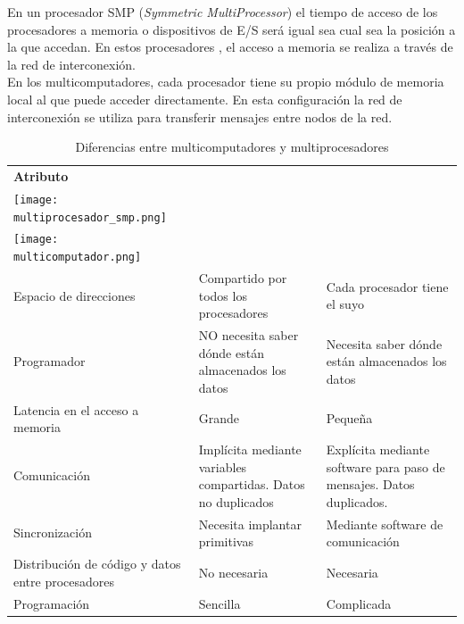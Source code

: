 \documentclass[12pt,spanish]{article}
\begin{document}
En un procesador SMP (\textit{Symmetric MultiProcessor}) el tiempo de acceso de los procesadores a memoria o dispositivos de E/S será igual sea cual sea la posición a la que accedan. En estos procesadores , el acceso a memoria se realiza a través de la red de interconexión.\\
En los multicomputadores, cada procesador tiene su propio módulo de memoria local al que puede acceder directamente. En esta configuración la red de interconexión se utiliza para transferir mensajes entre nodos de la red. \\

\begin{table}[H]
\centering
\begin{tabular}{|m{3cm}|m{6cm}|m{6cm}|}
\hline
\textbf{Atributo} & 
\begin{center}
\textbf{Multiprocesador SMP} 
\\
\texttt{[image: multiprocesador\_smp.png]} 
\end{center}
& 
\begin{center}
\textbf{Multicomputador} 
\\
\texttt{[image: multicomputador.png]} 
\end{center}
\\
\hline
Espacio de direcciones & Compartido por todos los procesadores & Cada procesador tiene el suyo \\
\hline
Programador & NO necesita saber dónde están almacenados los datos & Necesita saber dónde están almacenados los datos \\
\hline
Latencia en el acceso a memoria & Grande & Pequeña \\
\hline
Comunicación & Implícita mediante variables compartidas. Datos no duplicados & Explícita mediante
software para paso de mensajes. Datos duplicados. \\
\hline
Sincronización & Necesita implantar primitivas & Mediante software de comunicación \\
\hline
Distribución de código y datos entre procesadores & No necesaria & Necesaria \\
\hline
Programación & Sencilla & Complicada \\
\hline
\end{tabular}
\caption{Diferencias entre multicomputadores y multiprocesadores}
\end{table}
\end{document}
